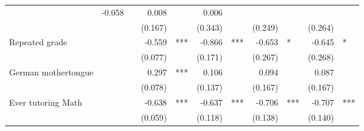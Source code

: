 \documentclass{article}
\begin{document}
\begin{table}[!h]
\begin{tabular}{lllllllllll}
  \multicolumn{1}{l}{} &
  \multicolumn{1}{r}{-0.058} &
  \multicolumn{1}{l}{} &
  \multicolumn{1}{r}{0.008} &
  \multicolumn{1}{l}{} &
  \multicolumn{1}{r}{0.006} &
  \multicolumn{1}{l}{} \\
\multicolumn{1}{l}{} &
  \multicolumn{1}{r}{} &
  \multicolumn{1}{l}{} &
  \multicolumn{1}{r}{(0.167)} &
  \multicolumn{1}{l}{} &
  \multicolumn{1}{r}{(0.343)} &
  \multicolumn{1}{l}{} &
  \multicolumn{1}{r}{(0.249)} &
  \multicolumn{1}{l}{} &
  \multicolumn{1}{r}{(0.264)} &
  \multicolumn{1}{l}{} \\
\multicolumn{1}{l}{Repeated grade} &
  \multicolumn{1}{r}{} &
  \multicolumn{1}{l}{} &
  \multicolumn{1}{r}{-0.559} &
  \multicolumn{1}{l}{***} &
  \multicolumn{1}{r}{-0.866} &
  \multicolumn{1}{l}{***} &
  \multicolumn{1}{r}{-0.653} &
  \multicolumn{1}{l}{*} &
  \multicolumn{1}{r}{-0.645} &
  \multicolumn{1}{l}{*} \\
\multicolumn{1}{l}{} &
  \multicolumn{1}{r}{} &
  \multicolumn{1}{l}{} &
  \multicolumn{1}{r}{(0.077)} &
  \multicolumn{1}{l}{} &
  \multicolumn{1}{r}{(0.171)} &
  \multicolumn{1}{l}{} &
  \multicolumn{1}{r}{(0.267)} &
  \multicolumn{1}{l}{} &
  \multicolumn{1}{r}{(0.268)} &
  \multicolumn{1}{l}{} \\
\multicolumn{1}{l}{German mothertongue} &
  \multicolumn{1}{r}{} &
  \multicolumn{1}{l}{} &
  \multicolumn{1}{r}{0.297} &
  \multicolumn{1}{l}{***} &
  \multicolumn{1}{r}{0.106} &
  \multicolumn{1}{l}{} &
  \multicolumn{1}{r}{0.094} &
  \multicolumn{1}{l}{} &
  \multicolumn{1}{r}{0.087} &
  \multicolumn{1}{l}{} \\
\multicolumn{1}{l}{} &
  \multicolumn{1}{r}{} &
  \multicolumn{1}{l}{} &
  \multicolumn{1}{r}{(0.078)} &
  \multicolumn{1}{l}{} &
  \multicolumn{1}{r}{(0.137)} &
  \multicolumn{1}{l}{} &
  \multicolumn{1}{r}{(0.167)} &
  \multicolumn{1}{l}{} &
  \multicolumn{1}{r}{(0.167)} &
  \multicolumn{1}{l}{} \\
\multicolumn{1}{l}{Ever tutoring Math} &
  \multicolumn{1}{r}{} &
  \multicolumn{1}{l}{} &
  \multicolumn{1}{r}{-0.638} &
  \multicolumn{1}{l}{***} &
  \multicolumn{1}{r}{-0.637} &
  \multicolumn{1}{l}{***} &
  \multicolumn{1}{r}{-0.706} &
  \multicolumn{1}{l}{***} &
  \multicolumn{1}{r}{-0.707} &
  \multicolumn{1}{l}{***} \\
\multicolumn{1}{l}{} &
  \multicolumn{1}{r}{} &
  \multicolumn{1}{l}{} &
  \multicolumn{1}{r}{(0.059)} &
  \multicolumn{1}{l}{} &
  \multicolumn{1}{r}{(0.118)} &
  \multicolumn{1}{l}{} &
  \multicolumn{1}{r}{(0.138)} &
  \multicolumn{1}{l}{} &
  \multicolumn{1}{r}{(0.140)} &

\end{tabular}
\end{table}
\end{document}
